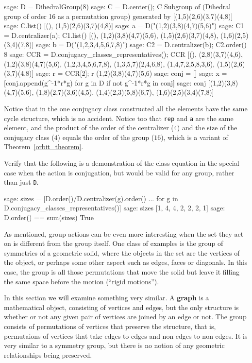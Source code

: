 %
\begin{sageexample}
sage: D = DihedralGroup(8)
sage: C = D.center(); C
Subgroup of (Dihedral group of order 16 as a permutation group) 
generated by [(1,5)(2,6)(3,7)(4,8)]
sage: C.list()
[(), (1,5)(2,6)(3,7)(4,8)]
sage: a = D("(1,2)(3,8)(4,7)(5,6)")
sage: C1 = D.centralizer(a); C1.list()
[(), (1,2)(3,8)(4,7)(5,6), (1,5)(2,6)(3,7)(4,8), (1,6)(2,5)(3,4)(7,8)]
sage: b = D("(1,2,3,4,5,6,7,8)")
sage: C2 = D.centralizer(b); C2.order()
8
sage: CCR = D.conjugacy_classes_representatives(); CCR
[(), (2,8)(3,7)(4,6), (1,2)(3,8)(4,7)(5,6), (1,2,3,4,5,6,7,8),
 (1,3,5,7)(2,4,6,8), (1,4,7,2,5,8,3,6), (1,5)(2,6)(3,7)(4,8)]
sage: r = CCR[2]; r
(1,2)(3,8)(4,7)(5,6)
sage: conj = []
sage: x = [conj.append(g^-1*r*g) for g in D if not g^-1*r*g in conj]
sage: conj
[(1,2)(3,8)(4,7)(5,6), (1,8)(2,7)(3,6)(4,5), (1,4)(2,3)(5,8)(6,7),
 (1,6)(2,5)(3,4)(7,8)]
\end{sageexample}
%
Notice that in the one conjugacy class constructed all the elements have the same cycle structure, which is no accident.  Notice too that \verb?rep? and \verb?a? are the same element, and the product of the order of the centralizer ($4$) and the size of the conjugacy class ($4$) equals the order of the group ($16$), which is a variant of Theorem~\ref{orbit_theorem}.\par
%
Verify that the following is a demonstration of the class equation in the special case when the action is conjugation, but would be valid for any group, rather than just \verb?D?.
%
\begin{sageexample}
sage: sizes = [D.order()/D.centralizer(g).order()
...                for g in D.conjugacy_classes_representatives()]
sage: sizes
[1, 4, 4, 2, 2, 2, 1]
sage: D.order() == sum(sizes)
True
\end{sageexample}
%
%
As mentioned, group actions can be even more interesting when the set they act on is different from the group itself.  One class of examples is the group of symmetries of a geometric solid, where the objects in the set are the vertices of the object, or perhaps some other aspect such as edges, faces or diagonals.  In this case, the group is all those permutations that move the solid but leave it filling the same space before the motion (``rigid motions'').\par
%
In this section we will examine something very similar.  A {\bf graph} is a mathematical object, consisting of vertices and edges, but the only structure is whether or not any given pair of vertices are joined by an edge or not.  The group consists of permutations of vertices that preserve the structure, that is, permutaions of vertices that take edges to edges and non-edges to non-edges.  It is very similar to a symmetry group, but there is no notion of any geometric relationships being preserved.\par
